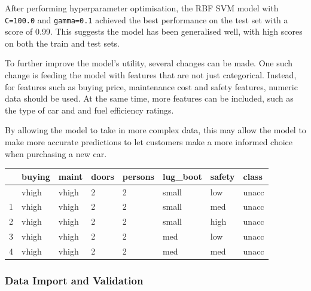 \documentclass[
  letterpaper,
  DIV=11,
  numbers=noendperiod]{scrartcl}
\begin{document}
After performing hyperparameter optimisation, the RBF SVM model with
\texttt{C=100.0} and \texttt{gamma=0.1} achieved the best performance on
the test set with a score of 0.99. This suggests the model has been
generalised well, with high scores on both the train and test sets.

To further improve the model's utility, several changes can be made. One
such change is feeding the model with features that are not just
categorical. Instead, for features such as buying price, maintenance
cost and safety features, numeric data should be used. At the same time,
more features can be included, such as the type of car and and fuel
efficiency ratings.

By allowing the model to take in more complex data, this may allow the
model to make more accurate predictions to let customers make a more
informed choice when purchasing a new car.

\begin{longtable}[]{@{}llllllll@{}}
\toprule\noalign{}
& buying & maint & doors & persons & lug\_boot & safety & class \\
\midrule\noalign{}
\endhead
\bottomrule\noalign{}
\endlastfoot
0 & vhigh & vhigh & 2 & 2 & small & low & unacc \\
1 & vhigh & vhigh & 2 & 2 & small & med & unacc \\
2 & vhigh & vhigh & 2 & 2 & small & high & unacc \\
3 & vhigh & vhigh & 2 & 2 & med & low & unacc \\
4 & vhigh & vhigh & 2 & 2 & med & med & unacc \\
\end{longtable}

\subsubsection{Data Import and
Validation}\label{data-import-and-validation}
\end{document}
